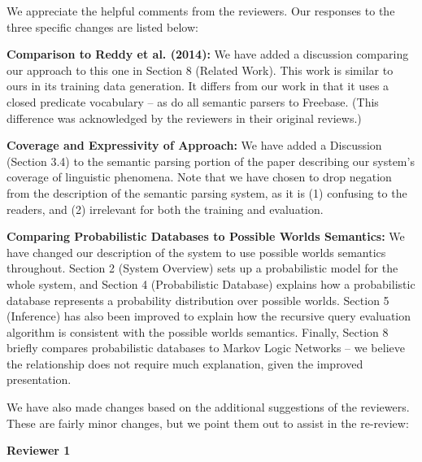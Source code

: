 \documentclass[10pt]{article}
\begin{document}
\maketitle

We appreciate the helpful comments from the reviewers. Our responses
to the three specific changes are listed below:

\begin{itemize*}

\item {\bf Comparison to Reddy et al. (2014):} We have added a
  discussion comparing our approach to this one in Section 8 (Related
  Work). This work is similar to ours in its training data
  generation. It differs from our work in that it uses a closed
  predicate vocabulary -- as do all semantic parsers to
  Freebase. (This difference was acknowledged by the reviewers in
  their original reviews.)

\item {\bf Coverage and Expressivity of Approach:} We have added a
  Discussion (Section 3.4) to the semantic parsing portion of the
  paper describing our system's coverage of linguistic phenomena. Note
  that we have chosen to drop negation from the description of the
  semantic parsing system, as it is (1) confusing to the readers, and
  (2) irrelevant for both the training and evaluation.

\item {\bf Comparing Probabilistic Databases to Possible Worlds
  Semantics:} We have changed our description of the system to use
  possible worlds semantics throughout. Section 2 (System Overview)
  sets up a probabilistic model for the whole system, and Section 4
  (Probabilistic Database) explains how a probabilistic database
  represents a probability distribution over possible worlds. Section
  5 (Inference) has also been improved to explain how the recursive
  query evaluation algorithm is consistent with the possible worlds
  semantics. Finally, Section 8 briefly compares probabilistic
  databases to Markov Logic Networks -- we believe the relationship
  does not require much explanation, given the improved presentation.

\end{itemize*}

We have also made changes based on the additional suggestions of the
reviewers. These are fairly minor changes, but we point them out to
assist in the re-review:

{\bf Reviewer 1}
\end{document}
